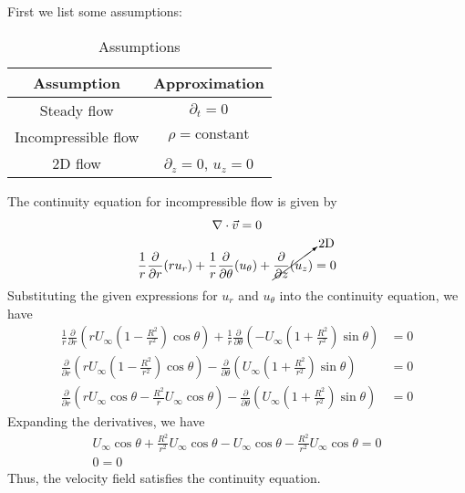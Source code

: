 \subsection{}
First we list some assumptions:
\begin{table}[h]    
    \centering
    \caption{Assumptions}
    \begin{tabular}{c|c}
        Assumption & Approximation \\
        \hline
        Steady flow & $\partial_t = 0$ \\
        Incompressible flow & $\rho = \text{constant}$ \\
        2D flow & $\partial_z = 0$, $u_z = 0$ \\
    \end{tabular}
\end{table}
\FloatBarrier
The continuity equation for incompressible flow is given by
\begin{gather*}
    \nabla \cdot \vec{v} = 0 \\
    \frac{1}{r} \frac{\partial}{\partial r}(r u_r) + \frac{1}{r}\frac{\partial}{\partial \theta}(u_{\theta}) + \cancelto{\text{2D}}{\frac{\partial}{\partial z}(u_z)} = 0
\end{gather*}
Substituting the given expressions for $u_r$ and $u_{\theta}$ into the continuity equation, we have
\begin{align*}
    \frac{1}{r} \frac{\partial}{\partial r}\left(r U_{\infty} \left(1 - \frac{R^2}{r^2}\right)\cos\theta\right) + \frac{1}{r}\frac{\partial}{\partial \theta}\left(-U_{\infty} \left(1 + \frac{R^2}{r^2}\right)\sin\theta\right) &= 0 \\
    \frac{\partial}{\partial r}\left(r U_{\infty} \left(1 - \frac{R^2}{r^2}\right)\cos\theta\right) - \frac{\partial}{\partial \theta}\left(U_{\infty} \left(1 + \frac{R^2}{r^2}\right)\sin\theta\right) &= 0  \\
    \frac{\partial}{\partial r}\left(r U_{\infty} \cos\theta - \frac{R^2}{r}U_{\infty}\cos\theta\right) - \frac{\partial}{\partial \theta}\left(U_{\infty}\left(1+ \frac{R^2}{r^2}\right)\sin\theta\right) &= 0 
\end{align*}
Expanding the derivatives, we have
\begin{gather*}
    U_{\infty}\cos\theta + \frac{R^2}{r^2}U_{\infty}\cos\theta - U_{\infty}\cos\theta - \frac{R^2}{r^2}U_{\infty}\cos\theta = 0 \\
    \boxed{0 = 0}
\end{gather*}
Thus, the velocity field satisfies the continuity equation.

